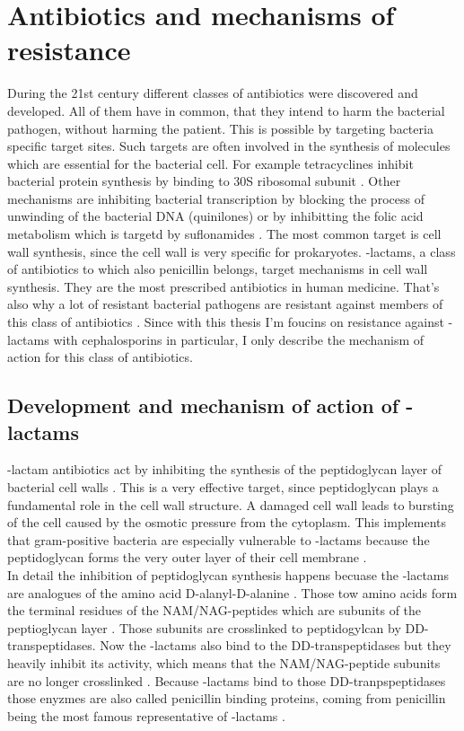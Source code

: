 \section{Antibiotics and mechanisms of resistance}
During the 21st century different classes of antibiotics were discovered and developed. All of them have in common, that they intend to harm the bacterial pathogen, without harming the patient. This is possible by targeting bacteria specific target sites. Such targets are often involved in the synthesis of molecules which are essential for the bacterial cell. 
For example tetracyclines inhibit bacterial protein synthesis by binding to 30S ribosomal subunit \cite{noauthor_mechanism_nodate}. Other mechanisms are inhibiting bacterial transcription by blocking the process of unwinding of the bacterial DNA (quinilones) or by inhibitting the folic acid metabolism which is targetd by suflonamides \cite{noauthor_fig._nodate}. 
The most common target is cell wall synthesis, since the cell wall is very specific for prokaryotes. \textbeta-lactams, a class of antibiotics to which also penicillin belongs, target mechanisms in cell wall synthesis. They are the most prescribed antibiotics in human medicine. That's also why a lot of resistant bacterial pathogens are resistant against members of this class of antibiotics \cite{noauthor_high_nodate}. Since with this thesis I'm foucins on resistance against \textbeta-lactams with cephalosporins in particular, I only describe the mechanism of action for this class of antibiotics. 

\subsection{Development and mechanism of action of \textbeta-lactams}

\textbeta-lactam antibiotics act by inhibiting the synthesis of the peptidoglycan layer of bacterial cell walls \cite{noauthor_-lactam_2019}. This is a very effective target, since peptidoglycan plays a fundamental role in the cell wall structure. A damaged cell wall leads to bursting of the cell caused by the osmotic pressure from the cytoplasm. This implements that gram-positive bacteria are especially vulnerable to \textbeta-lactams because the peptidoglycan forms the very outer layer of their cell membrane \cite{graevemoore_english:_2008}.\\
In detail the inhibition of peptidoglycan synthesis happens becuase the \textbeta-lactams are analogues of the amino acid D-alanyl-D-alanine \cite{fisher_bacterial_2005}. Those tow amino acids form the terminal residues of the NAM/NAG-peptides which are subunits of the peptioglycan layer \cite{fisher_bacterial_2005}. Those subunits are crosslinked to peptidogylcan by DD-transpeptidases. Now the \textbeta-lactams also bind to the DD-transpeptidases but they heavily inhibit its activity, which means that the NAM/NAG-peptide subunits are no longer crosslinked \cite{fisher_bacterial_2005}. Because \textbeta-lactams bind to those DD-tranpspeptidases those enyzmes are also called penicillin binding proteins, coming from penicillin being the most famous representative of \textbeta-lactams \cite{fisher_bacterial_2005}.

